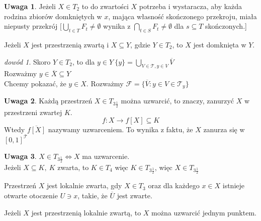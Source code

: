\documentclass[twoside,10pt]{article}
\theoremstyle{definition}
\theoremstyle{definition}
\theoremstyle{definition}
\theoremstyle{definition}
\theoremstyle{remark}
\newtheorem*{dd}{dowód}
\theoremstyle{definition}
\newtheorem*{uw}{Uwaga}
\theoremstyle{definition}
\theoremstyle{definition}
\theoremstyle{definition}
\theoremstyle{definition}
\theoremstyle{definition}
\begin{document}
\begin{uw} 
    Jeżeli $X \in T_2$ to do zwartości $X$ potrzeba i wystaracza, aby każda rodzina
    zbiorów domkniętych w $x$, mająca własność skończonego przekroju, miała niepusty 
    przekrój $[ \bigcup\limits_{t \in T} F_t \neq \emptyset$ wynika z $\bigcap\limits_{t
    \in S} F_t \neq \emptyset$ dla $ s \subseteq T$ skończonych.]
\end{uw} 
\begin{tw} 
    Jeżeli $X$ jest przestrzenią zwartą i $X \subseteq Y$, gdzie $Y \in T_2$, to 
    $X$ jest domknięta w $Y$.
\end{tw} 
\begin{dd} 
    Skoro $Y \in T_2$, to dla $y \in Y \ \{y\} = \bigcup\limits_{V \in \mathcal T,y \in V} \overline V$ \\ 
    Rozważmy $y \in \overline X \subseteq Y$ \\ 
    Chcemy pokazać, że $y \in X$. Rozważmy $\mathcal F = \{ \overline V: y \in V \in \mathcal T_y\}$ 
\end{dd} 
\begin{uw} Każdą przestrzeń $X \in T_{3 \frac{1}{2}}$ można uzwarcić, to znaczy, zanurzyć $X$ w przestrzeni zwartej $K$. 
    \[ f: X \to f[X] \subseteq K \] 
    Wtedy $\overline{f[X]}$ nazywamy uzwarceniem. To wynika z faktu, że $X$ zanurza się w $[0,1]^\mathcal T$
\end{uw} 
\begin{uw} 
    $X \in T_{3 \frac 12} \Leftrightarrow X$ ma uzwarcenie.\\ 
    Jeżeli $X \subseteq K,\ K$ zwarta, to $K \in T_4$ więc $K \in T_{3 \frac 12}$, więc $X \in T_{3\frac 12}$
\end{uw} 
\begin{df} 
    Przestrzeń $X$ jest lokalnie zwarta, gdy $X \in T_3$ oraz dla każdego $x \in X$ istnieje otwarte otoczenie $U \ni x$, takie, że 
    $\overline U$ jest zwarte.
\end{df} 
\begin{tw} 
    Jeżeli $X$ jest przestrzenią lokalnie zwartą, to $X$ można uzwarcić jednym punktem.
\end{tw} 
\end{document}
